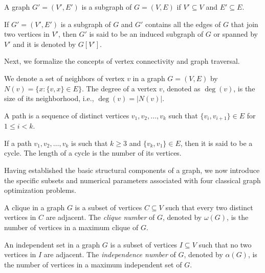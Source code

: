 \begin{definition}[Subgraph]
A graph $G' = (V', E')$ is a subgraph of $G = (V, E)$ if $V' \subseteq V$ and $E' \subseteq E$.
\end{definition}

\begin{definition}
If $G' = (V', E')$ is a subgraph of $G$ and $G'$ contains all the edges of $G$ that join two vertices in $V'$, then $G'$ is said to be an induced subgraph of $G$ or spanned by $V'$ and it is denoted by $G[V']$.
\end{definition}

Next, we formalize the concepts of vertex connectivity and graph traversal.

\begin{definition}[Neighbors]
We denote a set of neighbors of vertex $v$ in a graph $G = (V, E)$ by $N(v) = \{x : \{v,x\} \in E\}$. The degree of a vertex $v$, denoted as $\deg(v)$, is the size of its neighborhood, i.e., $\deg(v) = |N(v)|$. 
\end{definition}

\begin{definition}[Path]
A path is a sequence of distinct vertices $v_1, v_2, \dots, v_k$ such that $\{v_i, v_{i+1}\} \in E$ for $1 \le i < k$. 
\end{definition}

\begin{definition}[Cycle]
If a path $v_1, v_2, \dots, v_k$ is such that $k \ge 3$ and $\{v_k, v_1\} \in E$, then it is said to be a cycle. The length of a cycle is the number of its vertices.
\end{definition}

Having established the basic structural components of a graph, we now introduce the specific subsets and numerical parameters associated with four classical graph optimization problems. 

\begin{definition}
A clique in a graph $G$ is a subset of vertices $C \subseteq V$ such that every two distinct vertices in $C$ are adjacent. The \textit{clique number} of $G$, denoted by $\omega(G)$, is the number of vertices in a maximum clique of $G$.
\end{definition}

\begin{definition}
An independent set in a graph $G$ is a subset of vertices $I \subseteq V$ such that no two vertices in $I$ are adjacent. The \textit{independence number} of $G$, denoted by $\alpha(G)$, is the number of vertices in a maximum independent set of $G$.
\end{definition}

